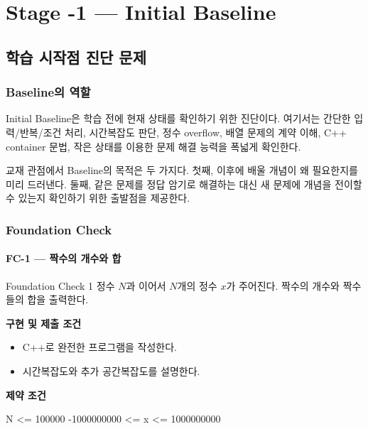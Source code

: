 \tableofcontents

\mainmatter

\part{Stage -1 --- Initial Baseline}
\chapter{학습 시작점 진단 문제}

\section{Baseline의 역할}
Initial Baseline은 학습 전에 현재 상태를 확인하기 위한 진단이다. 여기서는 간단한 입력/반복/조건 처리, 시간복잡도 판단, 정수 overflow, 배열 문제의 계약 이해, C++ container 문법, 작은 상태를 이용한 문제 해결 능력을 폭넓게 확인한다.

교재 관점에서 Baseline의 목적은 두 가지다. 첫째, 이후에 배울 개념이 왜 필요한지를 미리 드러낸다. 둘째, 같은 문제를 정답 암기로 해결하는 대신 새 문제에 개념을 전이할 수 있는지 확인하기 위한 출발점을 제공한다.

\section{Foundation Check}

\subsection{FC-1 --- 짝수의 개수와 합}
\begin{problembox}{Foundation Check 1}
정수 $N$과 이어서 $N$개의 정수 $x$가 주어진다. 짝수의 개수와 짝수들의 합을 출력한다.

\textbf{구현 및 제출 조건}
\begin{itemize}
  \item C++로 완전한 프로그램을 작성한다.
  \item 시간복잡도와 추가 공간복잡도를 설명한다.
\end{itemize}

\textbf{제약 조건}
\begin{TextBlock}
N <= 100000
-1000000000 <= x <= 1000000000
\end{TextBlock}
\end{problembox}

